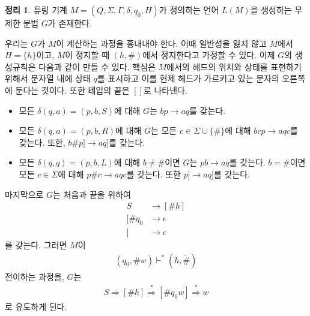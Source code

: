 \documentclass[b5paper, 10pt]{book}
\theoremstyle{definition}
\newtheorem{thm}[defn]{정리}
\newenvironment{pf*}{\pushQED{\qed}\pf}{\popQED\endpf}
\begin{document}
\begin{thm}
    튜링 기계 $M = (Q, \Sigma, \Gamma, \delta, q_0, H)$가 정의하는 언어
    $L(M)$을 생성하는 무제한 문법 $G$가 존재한다.
\end{thm}
\begin{pf*}
    우리는 $G$가 $M$이 계산하는 과정을 흉내내야 한다. 이때 일반성을 잃지 않고
    $M$에서 $H = \{h\}$이고, $M$이 정지할 때 $(h, \#)$에서 정지한다고
    가정할 수 있다. 
    이제 $G$의 생성규칙은 다음과 같이 만들 수 있다. 핵심은 $M$에서의 헤드의 위치와
    상태를 표현하기 위해서 문자열 내에 상태 $q$를 표시하고 이를 현제 헤드가 가르키고
    있는 문자의 오른쪽에 둔다는 것이다. 또한 테입의 끝은 $[]$로 나타낸다.
    \begin{itemize}
        \item 모든 $\delta(q, a) = (p, b, S)$에 대해 $G$는 $bp \rightarrow
        aq$를 갖는다.
        \item 모든 $\delta(q, a) = (p, b, R)$에 대해 $G$는 모든 $c \in \Sigma 
        \cup \{\#\}$에 대해 $bcp \rightarrow aqc$를 갖는다. 또한, $b\# p] \rightarrow
        aq]$를 갖는다.
        \item 모든 $\delta(q, q) = (p, b, L)$에 대해 $b \neq \#$이면 
        $G$는 $pb \rightarrow aq$를 갖는다. $b = \#$이면 모든 $c \in \Sigma$에 대해
        $p\# c \rightarrow aqc$를 갖는다. 또한 $p] \rightarrow aq]$를 갖는다. 
    \end{itemize}
    마지막으로 $G$는 처음과 끝을 위하여
    \begin{align*}
        S &\rightarrow [\# h] \\ 
        [\#q_0 &\rightarrow \epsilon \\ 
        ] &\rightarrow \epsilon
    \end{align*}
    를 갖는다. 그러면 $M$이 
    \begin{align*}
        (q_0, \underline{\#}w) \vdash^* (h, \underleftarrow{\#})
    \end{align*}
    전이하는 과정을, $G$는 
    \begin{align*}
        S \Rightarrow [\# h] \overset{*}{\Rightarrow} [\#q_0 w] 
        \overset{*}{\Rightarrow} w
    \end{align*}
    로 유도하게 된다. 
\end{pf*}
\end{document}

